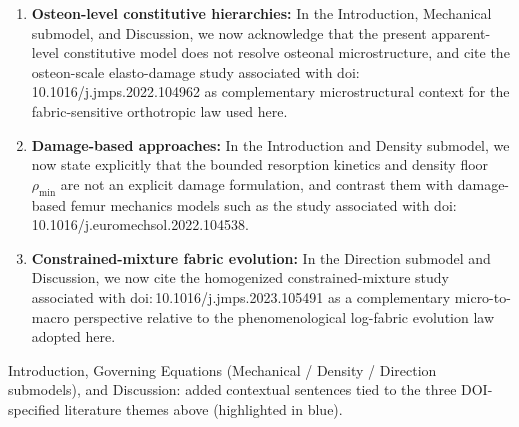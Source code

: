 \documentclass[11pt,a4paper]{article}
\newcommand{\change}{%
  \par\noindent{\color{blue}\textbf{Change in manuscript:}}\par\noindent\color{blue}%
}
\begin{document}
\begin{enumerate}[nosep]
\item \textbf{Osteon-level constitutive hierarchies:} In the Introduction, Mechanical submodel, and Discussion, we now acknowledge that the present apparent-level constitutive model does not resolve osteonal microstructure, and cite the osteon-scale elasto-damage study associated with doi:\,10.1016/j.jmps.2022.104962 as complementary microstructural context for the fabric-sensitive orthotropic law used here.
\item \textbf{Damage-based approaches:} In the Introduction and Density submodel, we now state explicitly that the bounded resorption kinetics and density floor $\rho_{\min}$ are not an explicit damage formulation, and contrast them with damage-based femur mechanics models such as the study associated with doi:\,10.1016/j.euromechsol.2022.104538.
\item \textbf{Constrained-mixture fabric evolution:} In the Direction submodel and Discussion, we now cite the homogenized constrained-mixture study associated with doi:\,10.1016/j.jmps.2023.105491 as a complementary micro-to-macro perspective relative to the phenomenological log-fabric evolution law adopted here.
\end{enumerate}

\change
Introduction, Governing Equations (Mechanical / Density / Direction submodels), and Discussion: added contextual sentences tied to the three DOI-specified literature themes above (highlighted in blue).

\end{document}
